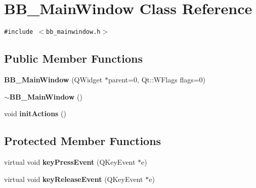 \section{BB\_\-Main\-Window Class Reference}
\label{classBB__MainWindow}
{\tt \#include $<$bb\_\-mainwindow.h$>$}

\subsection*{Public Member Functions}
\begin{CompactItemize}
\item 
{\bf BB\_\-Main\-Window} (QWidget $\ast$parent=0, Qt::WFlags flags=0)
\item 
{\bf $\sim$BB\_\-Main\-Window} ()
\item 
void {\bf init\-Actions} ()
\end{CompactItemize}
\subsection*{Protected Member Functions}
\begin{CompactItemize}
\item 
virtual void {\bf key\-Press\-Event} (QKey\-Event $\ast$e)
\item 
virtual void {\bf key\-Release\-Event} (QKey\-Event $\ast$e)\label{classBB__MainWindow_b1}

\end{CompactItemize}
